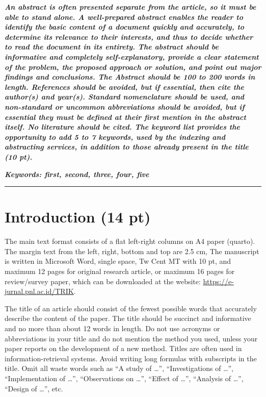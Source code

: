 \documentclass[10pt,a4paper]{article}
\begin{document}
{\fontsize{10pt}{13pt}\bfseries\itshape
An abstract is often presented separate from the article, so it must be able to stand alone. A well-prepared abstract enables the reader to identify the basic content of a document quickly and accurately, to determine its relevance to their interests, and thus to decide whether to read the document in its entirety. The abstract should be informative and completely self-explanatory, provide a clear statement of the problem, the proposed approach or solution, and point out major findings and conclusions. The Abstract should be 100 to 200 words in length. References should be avoided, but if essential, then cite the author(s) and year(s). Standard nomenclature should be used, and non-standard or uncommon abbreviations should be avoided, but if essential they must be defined at their first mention in the abstract itself. No literature should be cited. The keyword list provides the opportunity to add 5 to 7 keywords, used by the indexing and abstracting services, in addition to those already present in the title (10 pt).\par}

\vspace{6pt}
{\fontsize{10pt}{13pt}\bfseries\itshape Keywords: \normalfont\itshape first, second, three, four, five\par}

\vspace{4pt}
\noindent\rule{\textwidth}{0.5pt}
\vspace{6pt}

\section{Introduction (14 pt)}

The main text format consists of a flat left-right columns on A4 paper (quarto). The margin text from the left, right, bottom and top are 2.5 cm, The manuscript is written in Microsoft Word, single space, Tw Cent MT with 10 pt, and maximum 12 pages for original research article, or maximum 16 pages for review/survey paper, which can be downloaded at the website: \url{https://e-jurnal.pnl.ac.id/TRIK}.

The title of an article should consist of the fewest possible words that accurately describe the content of the paper. The title should be succinct and informative and no more than about 12 words in length. Do not use acronyms or abbreviations in your title and do not mention the method you used, unless your paper reports on the development of a new method. Titles are often used in information-retrieval systems. Avoid writing long formulas with subscripts in the title. Omit all waste words such as ``A study of \dots'', ``Investigations of \dots'', ``Implementation of \dots'', ``Observations on \dots'', ``Effect of \dots'', ``Analysis of \dots'', ``Design of \dots'', etc.
\end{document}
